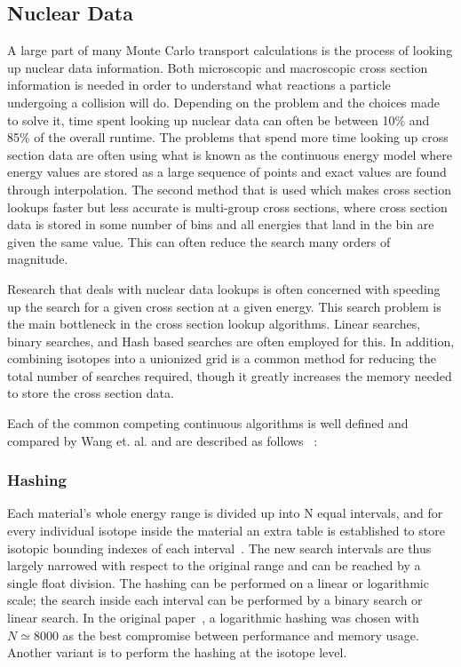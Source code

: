 \subsection{\textbf{Nuclear Data}}

A large part of many Monte Carlo transport calculations is the process of looking up nuclear data information.
%
Both microscopic and macroscopic cross section information is needed in order to understand what reactions a particle undergoing a collision will do.
%
Depending on the problem and the choices made to solve it, time spent looking up nuclear data can often be between 10\% and 85\% of the overall runtime.
%
The problems that spend more time looking up cross section data are often using what is known as the continuous energy model where energy values are stored as a large sequence of points and exact values are found through interpolation.
%
The second method that is used which makes cross section lookups faster but less accurate is multi-group cross sections, where cross section data is stored in some number of bins and all energies that land in the bin are given the same value.
%
This can often reduce the search many orders of magnitude.
%

%
Research that deals with nuclear data lookups is often concerned with speeding up the search for a given cross section at a given energy.
%
This search problem is the main bottleneck in the cross section lookup algorithms.
%
Linear searches, binary searches, and Hash based searches are often employed for this.
%
In addition, combining isotopes into a unionized grid is a common method for reducing the total number of searches required, though it greatly increases the memory needed to store the cross section data.
%

Each of the common competing continuous algorithms is well defined and compared by Wang et. al. and are described as follows ~\cite{wang2016competing}:
%
\subsubsection*{ \textbf{Hashing} } Each material's whole energy range is divided up into N equal intervals, and for every individual isotope inside the material an extra table is established to store isotopic bounding indexes of each interval~\cite{brown2014new}. The new search intervals are thus largely narrowed with respect to the original range and can be reached by a single float division. The hashing can be performed on a linear or logarithmic scale; the search inside each interval can be performed by a binary search or linear search. In the original paper~\cite{brown2014new}, a logarithmic hashing was chosen with $ N \simeq 8000 $ as the best compromise between performance and memory usage. Another variant is to perform the hashing at the isotope level.
%
